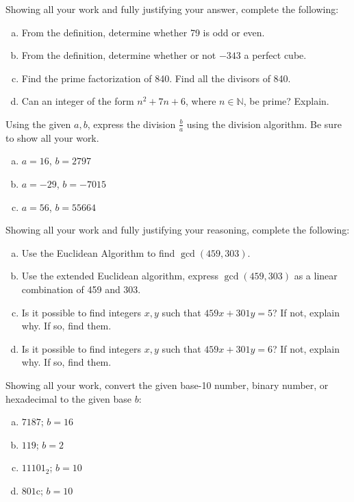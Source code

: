 \documentclass[11pt,letterpaper]{article}
\begin{document}

 Showing all your work and fully justifying your answer, complete the following:
	\begin{enumerate}[(a)]
	\item From the definition, determine whether 79 is odd or even. 
	\item From the definition, determine whether or not $-343$ a perfect cube.
	\item Find the prime factorization of 840. Find all the divisors of 840. 
	\item Can an integer of the form $n^2 + 7n + 6$, where $n \in \mathbb{N}$, be prime? Explain. 
	\end{enumerate}



\newpage



 Using the given $a, b$, express the division $\frac{b}{a}$ using the division algorithm. Be sure to show all your work. 
	\begin{enumerate}[(a)]
	\item $a= 16$, $b= 2797$
	\item $a= -29$, $b= -7015$
	\item $a= 56$, $b= 55664$
	\end{enumerate}



\newpage



 Showing all your work and fully justifying your reasoning, complete the following: 
	\begin{enumerate}[(a)]
	\item Use the Euclidean Algorithm to find $\gcd(459, 303)$. 
	\item Use the extended Euclidean algorithm, express $\gcd(459, 303)$ as a linear combination of 459 and 303. 
	\item Is it possible to find integers $x, y$ such that $459x + 301y= 5$? If not, explain why. If so, find them.  
	\item Is it possible to find integers $x, y$ such that $459x + 301y= 6$? If not, explain why. If so, find them.  
	\end{enumerate}



\newpage



 Showing all your work, convert the given base-10 number, binary number, or hexadecimal to the given base $b$:
	\begin{enumerate}[(a)]
	\item $7187$; $b= 16$
	\item $119$; $b= 2$
	\item $11101_2$; $b= 10$
	\item $801\text{c}$; $b= 10$
	\end{enumerate}
\end{document}
